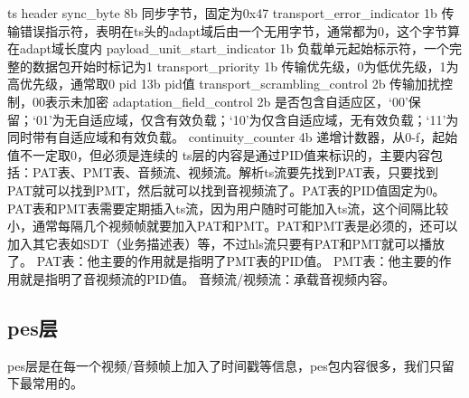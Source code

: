 \documentclass[bachelor]{thesis-uestc}
\begin{document}
     
ts header
sync\_byte	8b	同步字节，固定为0x47
transport\_error\_indicator	1b	传输错误指示符，表明在ts头的adapt域后由一个无用字节，通常都为0，这个字节算在adapt域长度内
payload\_unit\_start\_indicator	1b	负载单元起始标示符，一个完整的数据包开始时标记为1
transport\_priority	1b	传输优先级，0为低优先级，1为高优先级，通常取0
pid	13b	pid值
transport\_scrambling\_control	2b	传输加扰控制，00表示未加密
adaptation\_field\_control	2b	是否包含自适应区，‘00’保留；‘01’为无自适应域，仅含有效负载；‘10’为仅含自适应域，无有效负载；‘11’为同时带有自适应域和有效负载。
continuity\_counter	4b	递增计数器，从0-f，起始值不一定取0，但必须是连续的
     ts层的内容是通过PID值来标识的，主要内容包括：PAT表、PMT表、音频流、视频流。解析ts流要先找到PAT表，只要找到PAT就可以找到PMT，然后就可以找到音视频流了。PAT表的PID值固定为0。PAT表和PMT表需要定期插入ts流，因为用户随时可能加入ts流，这个间隔比较小，通常每隔几个视频帧就要加入PAT和PMT。PAT和PMT表是必须的，还可以加入其它表如SDT（业务描述表）等，不过hls流只要有PAT和PMT就可以播放了。
PAT表：他主要的作用就是指明了PMT表的PID值。
PMT表：他主要的作用就是指明了音视频流的PID值。
音频流/视频流：承载音视频内容。

\subsection{pes层}

     pes层是在每一个视频/音频帧上加入了时间戳等信息，pes包内容很多，我们只留下最常用的。
\end{document}
